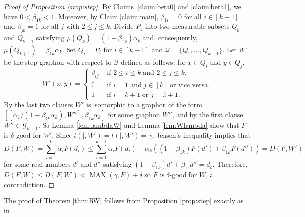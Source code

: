 \documentclass[11pt]{article}
\theoremstyle{definition}
\begin{document}
\begin{proof}[Proof of Proposition \ref{prop:step}]
    By Claims~\ref{claim:beta0} and \ref{claim:beta1}, we have $0 < \beta_{1k} < 1$. Moreover, by Claim \ref{claim:main},  $\beta_{1i} = 0$ for all $i \in [k-1]$ and $\beta_{jk} = 1$ for all $j$ with $2 \le j \le k$. Divide $P_k$ into two measurable subsets $Q_k$ and $Q_{k + 1}$ satisfying $\mu (Q_k) = (1 - \beta_{1k}) \alpha_k$ and, consequently, $\mu (Q_{k + 1}) = \beta_{1k} \alpha_k$. Set $Q_i = P_i$ for $i \in [k-1]$ and $\mathcal{Q} = \{ Q_1, \ldots, Q_{k + 1} \}$. Let $W'$ be the step graphon with respect to $\mathcal{Q}$ defined as follows: for $x \in Q_i$ and $y \in Q_j$, \[ W' (x,y) = \begin{cases}
        \beta_{ij} & \text{ if $2 \le i \le k$ and $2 \le j \le k$,} \\
        0 & \text{ if $i=1$ and $j \in [k]$ or vice versa,} \\
        1 & \text{ if $i = k+ 1$ or $j = k + 1$.}
    \end{cases} \] By the last two clauses $W'$ is isomorphic to a graphon of the form $[[\alpha_1 / (1 - \beta_{1k} \alpha_k), W''], \beta_{1k} \alpha_k]$ for some graphon $W''$, and by the first clause $W'' \in \mathcal{G}_{k-1}$. So Lemma \ref{lem:lambdaW} and Lemma \ref{lem:Wlambda} show that $F$ is $\delta$-good for $W'$. Since $t (|, W') = t (|, W') = \gamma$, Jensen's inequality implies that
    \[ D (F, W) = \sum_{i = 1}^k \alpha_i F (d_i) \leq \sum_{i = 1}^{k - 1} \alpha_i F (d_i) + \alpha_k ((1 - \beta_{1k}) F (d') + \beta_{1k} F (d'')) = D (F, W') \]
    for some real numbers $d'$ and $d''$ satisfying $(1 - \beta_{1k}) d' + \beta_{1k} d'' = d_k$. Therefore, $D (F, W) \le D (F, W') < \operatorname{MAX} (\gamma, F) + \delta$ so $F$ is $\delta$-good for $W$, a contradiction.
\end{proof}

The proof of Theorem \ref{thm:RW} follows from Proposition \ref{prop:step} exactly as in \cite{RW}.
\medskip
\end{document}

